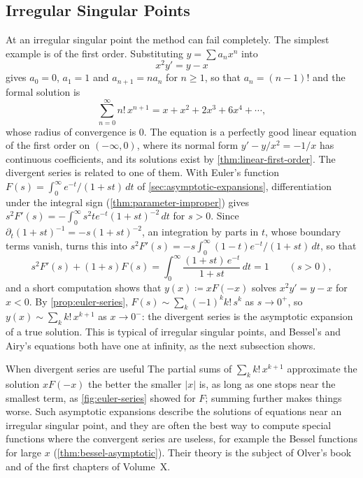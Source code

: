 \subsection{Irregular Singular Points}

At an irregular singular point the method can fail completely. The simplest example is of the first order. Substituting $y=\sum a_nx^n$ into
\[
x^2y'=y-x
\]
gives $a_0=0$, $a_1=1$ and $a_{n+1}=na_n$ for $n\ge1$, so that $a_n=(n-1)!$ and the formal solution is
\[
\sum_{n=0}^\infty n!\,x^{n+1}=x+x^2+2x^3+6x^4+\cdots ,
\]
whose radius of convergence is $0$. The equation is a perfectly good linear equation of the first order on $(-\infty,0)$, where its normal form $y'-y/x^2=-1/x$ has continuous coefficients, and its solutions exist by \cref{thm:linear-first-order}. The divergent series is related to one of them. With Euler's function $F(s)=\int_0^\infty e^{-t}/(1+st)\,dt$ of \cref{sec:asymptotic-expansions}, differentiation under the integral sign (\cref{thm:parameter-improper}) gives $s^2F'(s)=-\int_0^\infty s^2te^{-t}(1+st)^{-2}\,dt$ for $s>0$. Since $\partial_t(1+st)^{-1}=-s(1+st)^{-2}$, an integration by parts in $t$, whose boundary terms vanish, turns this into $s^2F'(s)=-s\int_0^\infty(1-t)e^{-t}/(1+st)\,dt$, so that
\[
s^2F'(s)+(1+s)F(s)=\int_0^\infty\frac{(1+st)\,e^{-t}}{1+st}\,dt=1\qquad(s>0),
\]
and a short computation shows that $y(x)\coloneqq xF(-x)$ solves $x^2y'=y-x$ for $x<0$. By \cref{prop:euler-series}, $F(s)\sim\sum_k(-1)^kk!\,s^k$ as $s\to0^+$, so $y(x)\sim\sum_kk!\,x^{k+1}$ as $x\to0^-$: the divergent series is the asymptotic expansion of a true solution. This is typical of irregular singular points, and Bessel's and Airy's equations both have one at infinity, as the next subsection shows.

\begin{note}{When divergent series are useful}
The partial sums of $\sum_kk!\,x^{k+1}$ approximate the solution $xF(-x)$ the better the smaller $|x|$ is, as long as one stops near the smallest term, as \cref{fig:euler-series} showed for $F$; summing further makes things worse. Such asymptotic expansions describe the solutions of equations near an irregular singular point, and they are often the best way to compute special functions where the convergent series are useless, for example the Bessel functions for large $x$ (\cref{thm:bessel-asymptotic}). Their theory is the subject of Olver's book~\cite{olver1997asymptotics} and of the first chapters of Volume~X.
\end{note}


